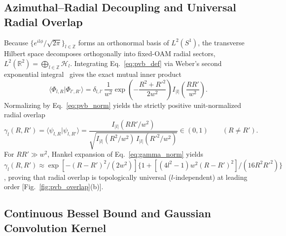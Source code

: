 \documentclass{optica-article}
\newcommand{\braket}[2]{\langle #1 | #2 \rangle}
\newcommand{\abs}[1]{\lvert #1 \rvert}
\begin{document}
\subsection{Azimuthal--Radial Decoupling and Universal Radial Overlap}

Because $\{e^{il\phi}/\sqrt{2\pi}\}_{l\in\mathbb{Z}}$ forms an orthonormal basis of $L^2(S^1)$, the transverse Hilbert space decomposes orthogonally into fixed-OAM radial sectors, $L^2(\mathbb{R}^2) = \bigoplus_{l\in\mathbb{Z}} \mathcal{H}_l$. Integrating Eq.~\eqref{eq:pvb_def} via Weber's second exponential integral~\cite{Gradshteyn2014} gives the exact mutual inner product
\begin{equation}
  \braket{\Phi_{l,R}}{\Phi_{l',R'}} = \delta_{l,l'}\,\frac{1}{w^2}\exp\!\left(-\frac{R^2 + R'^2}{2w^2}\right) I_{\abs{l}}\!\left(\frac{RR'}{w^2}\right).
  \label{eq:inner_prod}
\end{equation}
Normalizing by Eq.~\eqref{eq:pvb_norm} yields the strictly positive unit-normalized radial overlap
\begin{equation}
  \gamma_l(R,R') = \braket{\psi_{l,R}}{\psi_{l,R'}} = \frac{I_{\abs{l}}(RR'/w^2)}{\sqrt{I_{\abs{l}}(R^2/w^2)\,I_{\abs{l}}(R'^2/w^2)}} \in (0,1) \qquad (R \neq R').
  \label{eq:gamma_norm}
\end{equation}
For $RR' \gg w^2$, Hankel expansion of Eq.~\eqref{eq:gamma_norm} yields $\gamma_l(R,R') \approx \exp[-(R-R')^2/(2w^2)]\{1 + [(4l^2-1)w^2(R-R')^2]/(16 R^2 R'^2)\}$, proving that radial overlap is topologically universal ($l$-independent) at leading order [Fig.~\ref{fig:pvb_overlap}(b)].

\subsection{Continuous Bessel Bound and Gaussian Convolution Kernel}
\end{document}
